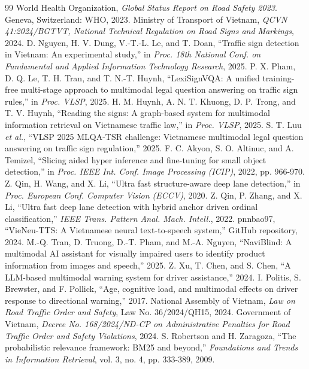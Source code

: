 \documentclass[conference,a4paper]{IEEEtran}
\begin{document}
\begin{thebibliography}{99}
 World Health Organization, \emph{Global Status Report on Road Safety 2023}. Geneva, Switzerland: WHO, 2023.
 Ministry of Transport of Vietnam, \emph{QCVN 41:2024/BGTVT, National Technical Regulation on Road Signs and Markings}, 2024.
 D. Nguyen, H. V. Dung, V.-T.-L. Le, and T. Doan, ``Traffic sign detection in Vietnam: An experimental study,'' in \emph{Proc. 18th National Conf. on Fundamental and Applied Information Technology Research}, 2025.
 P. X. Pham, D. Q. Le, T. H. Tran, and T. N.-T. Huynh, ``LexiSignVQA: A unified training-free multi-stage approach to multimodal legal question answering on traffic sign rules,'' in \emph{Proc. VLSP}, 2025.
 H. M. Huynh, A. N. T. Khuong, D. P. Trong, and T. V. Huynh, ``Reading the signs: A graph-based system for multimodal information retrieval on Vietnamese traffic law,'' in \emph{Proc. VLSP}, 2025.
 S. T. Luu \emph{et al.}, ``VLSP 2025 MLQA-TSR challenge: Vietnamese multimodal legal question answering on traffic sign regulation,'' 2025.
 F. C. Akyon, S. O. Altinuc, and A. Temizel, ``Slicing aided hyper inference and fine-tuning for small object detection,'' in \emph{Proc. IEEE Int. Conf. Image Processing (ICIP)}, 2022, pp. 966-970.
 Z. Qin, H. Wang, and X. Li, ``Ultra fast structure-aware deep lane detection,'' in \emph{Proc. European Conf. Computer Vision (ECCV)}, 2020.
 Z. Qin, P. Zhang, and X. Li, ``Ultra fast deep lane detection with hybrid anchor driven ordinal classification,'' \emph{IEEE Trans. Pattern Anal. Mach. Intell.}, 2022.
 pnnbao97, ``VieNeu-TTS: A Vietnamese neural text-to-speech system,'' GitHub repository, 2024.
 M.-Q. Tran, D. Truong, D.-T. Pham, and M.-A. Nguyen, ``NaviBlind: A multimodal AI assistant for visually impaired users to identify product information from images and speech,'' 2025.
 Z. Xu, T. Chen, and S. Chen, ``A LLM-based multimodal warning system for driver assistance,'' 2024.
 I. Politis, S. Brewster, and F. Pollick, ``Age, cognitive load, and multimodal effects on driver response to directional warning,'' 2017.
 National Assembly of Vietnam, \emph{Law on Road Traffic Order and Safety}, Law No. 36/2024/QH15, 2024.
 Government of Vietnam, \emph{Decree No. 168/2024/ND-CP on Administrative Penalties for Road Traffic Order and Safety Violations}, 2024.
 S. Robertson and H. Zaragoza, ``The probabilistic relevance framework: BM25 and beyond,'' \emph{Foundations and Trends in Information Retrieval}, vol. 3, no. 4, pp. 333-389, 2009.
\end{thebibliography}
\end{document}
